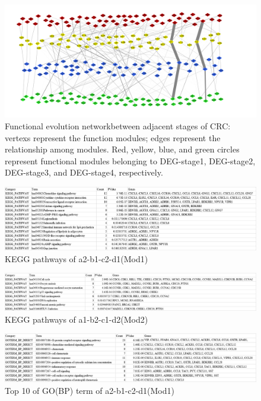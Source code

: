 \documentclass[utf8]{frontiersSCNS} %
\begin{document}
\begin{figure}[ht]
	\begin{center}
		\includegraphics[width=0.98\linewidth,height=0.3\textheight]{FIG/evalution}
	\end{center}
	\caption{ Functional evolution networkbetween adjacent stages of CRC: vertexs represent the function modules; edges represent the relationship among modules. Red, yellow, blue, and green circles represent functional modules belonging to DEG-stage1, DEG-stage2, DEG-stage3, and DEG-stage4, respectively.}\label{evalution}
\end{figure}
\begin{figure}
	\centering
	\includegraphics[width=0.98\linewidth]{FIG/screenshot001}
	\caption{KEGG pathways of a2-b1-c2-d1(Mod1)}
	\label{fig:screenshot001}
\end{figure}


\begin{figure}
	\centering
	\includegraphics[width=0.98\linewidth]{FIG/screenshot002}
	\caption{KEGG pathways of a1-b2-c1-d2(Mod2)}
	\label{fig:screenshot002}
\end{figure}


\begin{figure}
	\centering
	\includegraphics[width=0.98\linewidth]{FIG/screenshot003}
	\caption{Top 10 of GO(BP) term of a2-b1-c2-d1(Mod1)}
	\label{fig:screenshot003}
\end{figure}
\end{document}
